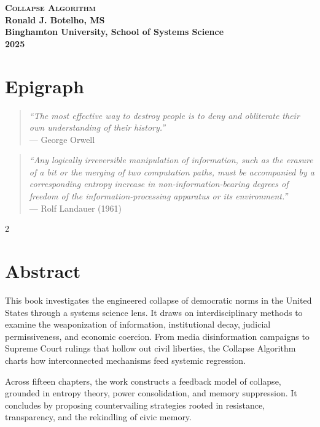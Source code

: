 \begin{flushleft}
\textbf{\LARGE{\textsc{Collapse Algorithm}}} \\
\textbf{\large{Ronald J. Botelho, MS}} \\
\textbf{\normalsize{Binghamton University, School of Systems Science}} \\
\textbf{\normalsize{2025}} \\
\end{flushleft}

\newpage

\section*{Epigraph}
\begin{quote}
\textit{``The most effective way to destroy people is to deny and obliterate their own understanding of their history.''} \\
\hfill --- George Orwell
\end{quote}

\vspace{1cm}

\begin{quote}
\textit{``Any logically irreversible manipulation of information, such as the erasure of a bit or the merging of two computation paths, must be accompanied by a corresponding entropy increase in non-information-bearing degrees of freedom of the information-processing apparatus or its environment.''} \\
\hfill --- Rolf Landauer (1961)
\end{quote}2

\newpage

\section*{Abstract}
This book investigates the engineered collapse of democratic norms in the United States through a systems science lens. It draws on interdisciplinary methods to examine the weaponization of information, institutional decay, judicial permissiveness, and economic coercion. From media disinformation campaigns to Supreme Court rulings that hollow out civil liberties, the Collapse Algorithm charts how interconnected mechanisms feed systemic regression.

Across fifteen chapters, the work constructs a feedback model of collapse, grounded in entropy theory, power consolidation, and memory suppression. It concludes by proposing countervailing strategies rooted in resistance, transparency, and the rekindling of civic memory.

